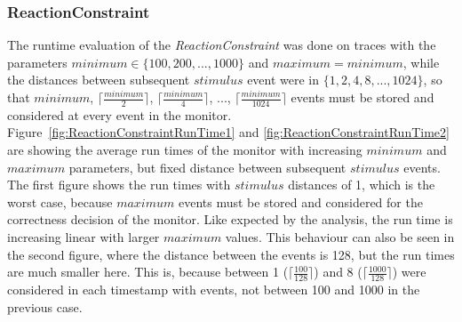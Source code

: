 \subsubsection{ReactionConstraint}
The runtime evaluation of the \textit{ReactionConstraint} was done on traces with the parameters $minimum\in\{100,200,...,1000\}$ and $maximum = minimum$, while the distances between subsequent $stimulus$ event were in $\{1, 2, 4, 8, ..., 1024\}$, so that $minimum$, $\lceil\frac{minimum}{2}\rceil$,  $\lceil\frac{minimum}{4}\rceil$, ...,  $\lceil\frac{minimum}{1024}\rceil$ events must be stored and considered at every event in the monitor.\\
Figure~\ref{fig:ReactionConstraintRunTime1} and \ref{fig:ReactionConstraintRunTime2} are showing the average run times of the monitor with increasing $minimum$ and $maximum$ parameters, but fixed distance between subsequent $stimulus$ events. The first figure shows the run times with $stimulus$ distances of 1, which is the worst case, because $maximum$ events must be stored and considered for the correctness decision of the monitor. Like expected by the analysis, the run time is increasing linear with larger $maximum$ values. This behaviour can also be seen in the second figure, where the distance between the events is 128, but the run times are much smaller here. This is, because between 1 ($\lceil \frac{100}{128}\rceil$) and 8 ($\lceil \frac{1000}{128}\rceil$) were considered in each timestamp with events, not between 100 and 1000 in the previous case.
